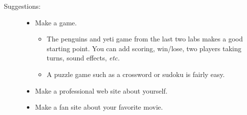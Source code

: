 \documentclass{article}
\begin{document}
\begin{description}
\item[Suggestions:]\mbox{}
  \begin{itemize}
  \item
    Make a game.
    \begin{itemize}
      \item The penguins and yeti game from the
    last two labs makes a good starting point.  You can add scoring,
    win/lose, two players taking turns, sound effects, {\em etc.}
  \item A puzzle game such as a crossword or sudoku is fairly easy.
    \end {itemize}
  \item
    Make a professional web site about yourself.
  \item
    Make a fan site about your favorite movie.
  \end{itemize}
\end{description}
\end{document}
